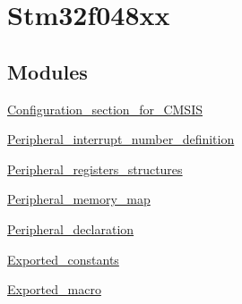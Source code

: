 \hypertarget{group__stm32f048xx}{}\section{Stm32f048xx}
\label{group__stm32f048xx}
\subsection*{Modules}
\begin{DoxyCompactItemize}
\item 
\hyperlink{group___configuration__section__for___c_m_s_i_s}{Configuration\+\_\+section\+\_\+for\+\_\+\+C\+M\+S\+IS}
\item 
\hyperlink{group___peripheral__interrupt__number__definition}{Peripheral\+\_\+interrupt\+\_\+number\+\_\+definition}
\item 
\hyperlink{group___peripheral__registers__structures}{Peripheral\+\_\+registers\+\_\+structures}
\item 
\hyperlink{group___peripheral__memory__map}{Peripheral\+\_\+memory\+\_\+map}
\item 
\hyperlink{group___peripheral__declaration}{Peripheral\+\_\+declaration}
\item 
\hyperlink{group___exported__constants}{Exported\+\_\+constants}
\item 
\hyperlink{group___exported__macro}{Exported\+\_\+macro}
\end{DoxyCompactItemize}
